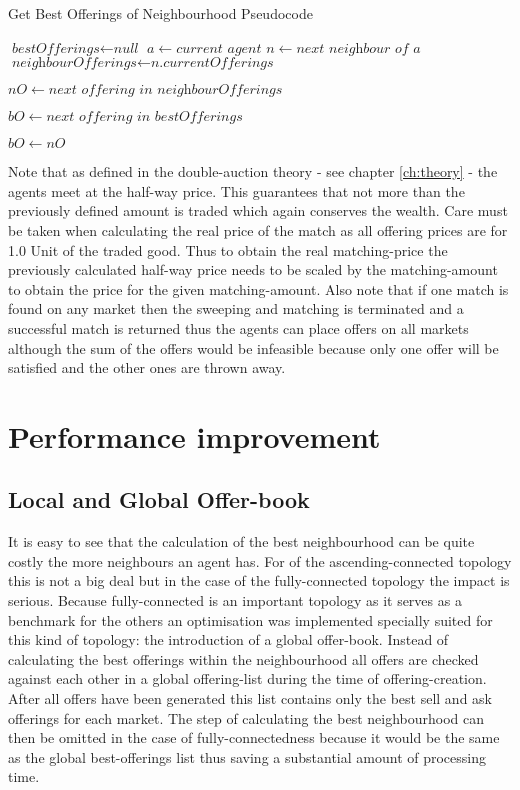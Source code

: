 \documentclass[Bachelorarbeit.tex]{subfiles}
\begin{document}
\begin{algorithm}
\caption{Get Best Offerings of Neighbourhood Pseudocode}\label{euclid}
\begin{algorithmic}[1]
\State $\textit{bestOfferings} \gets \textit{null}$
\State $a \gets \textit{current agent}$
	\State $n \gets \textit{next neighbour of a}$
	\State $\textit{neighbourOfferings} \gets \textit{n.currentOfferings}$
	
		\State $nO \gets \textit{next offering in neighbourOfferings}$
		
			\State $bO \gets \textit{next offering in bestOfferings}$
		
				\State $bO \gets nO$
			\EndIf
		\EndFor
	\EndFor
\EndFor
\end{algorithmic}
\end{algorithm}

Note that as defined in the double-auction theory - see chapter \ref{ch:theory} - the agents meet at the half-way price. This guarantees that not more than the previously defined amount is traded which again conserves the wealth. Care must be taken when calculating the real price of the match as all offering prices are for 1.0 Unit of the traded good. Thus to obtain the real matching-price the previously calculated half-way price needs to be scaled by the matching-amount to obtain the price for the given matching-amount.
\medskip
Also note that if one match is found on any market then the sweeping and matching is terminated and a successful match is returned thus the agents can place offers on all markets although the sum of the offers would be infeasible because only one offer will be satisfied and the other ones are thrown away.

\section{Performance improvement}
\label{sec:implementation_performanceImprovement}

\subsection{Local and Global Offer-book}
It is easy to see that the calculation of the best neighbourhood can be quite costly the more neighbours an agent has. For of the ascending-connected topology this is not a big deal but in the case of the fully-connected topology the impact is serious. Because fully-connected is an important topology as it serves as a benchmark for the others an optimisation was implemented specially suited for this kind of topology: the introduction of a global offer-book. Instead of calculating the best offerings within the neighbourhood all offers are checked against each other in a global offering-list during the time of offering-creation. After all offers have been generated this list contains only the best sell and ask offerings for each market. The step of calculating the best neighbourhood can then be omitted in the case of fully-connectedness because it would be the same as the global best-offerings list thus saving a substantial amount of processing time.
\end{document}
